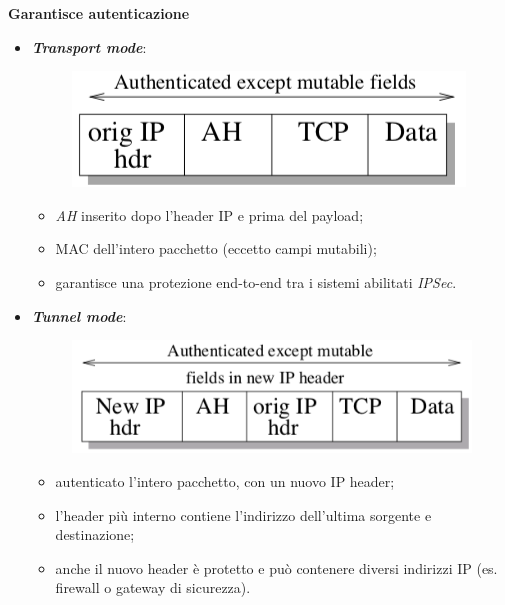 \documentclass[11pt, a4paper, twoside, italian]{report}
\theoremstyle{plain}
\begin{document}
\noindent
\textbf{Garantisce autenticazione}
\begin{multicols}{2}
\begin{itemize}
	\item \textit{\textbf{Transport mode}}:
		\begin{figure}[H]
			\centering
			\includegraphics[scale=0.5]{ahtransportmode}
		\end{figure}
		\begin{itemize}
			\item \textit{AH} inserito dopo l'header IP e prima del payload;
			\item MAC dell'intero pacchetto (eccetto campi mutabili);
			\item garantisce una protezione end-to-end tra i sistemi abilitati \textit{IPSec}.
		\end{itemize}
\columnbreak
	\item \textit{\textbf{Tunnel mode}}:
		\begin{figure}[H]
			\centering
			\includegraphics[scale=0.5]{ahtunnelmode}
		\end{figure}
		\begin{itemize}
			\item autenticato l'intero pacchetto, con un nuovo IP header;
			\item l'header più interno contiene l'indirizzo dell'ultima sorgente e destinazione;
			\item anche il nuovo header è protetto e può contenere diversi indirizzi IP (es. firewall o gateway di sicurezza).
		\end{itemize}
\end{itemize}
\end{multicols}
\end{document}
